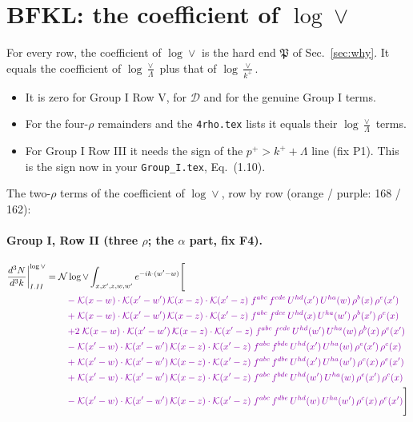 \documentclass[10pt]{article}
\numberwithin{equation}{section}
\newcommand{\NNv}{\mathcal N\log\vee}
\begin{document}
\section{BFKL: the coefficient of $\log\vee$}\label{sec:bfkl}
For every row, the coefficient of $\log\vee$ is the hard end $\mathfrak P$ of Sec.~\ref{sec:why}. It equals the coefficient of $\log\frac{\vee}{\Lambda}$ plus that of $\log\frac{\vee}{k^+}$.
\begin{itemize}
\item It is zero for Group I Row V, for $\mathcal D$ and for the genuine Group I terms.
\item For the four-$\rho$ remainders and the \texttt{4rho.tex} lists it equals their $\log\frac{\vee}{\Lambda}$ terms.
\item For Group I Row III it needs the sign of the $p^+>k^++\Lambda$ line (fix P1). This is the sign now in your \texttt{Group\_I.tex}, Eq.~(1.10).
\end{itemize}
The two-$\rho$ terms of the coefficient of $\log\vee$, row by row (orange / purple: 168 / 162):
\paragraph{Group I, Row II (three $\rho$; the $\alpha$ part, fix F4).}
\begin{align}
\frac{d^3N}{d^3k}\bigg|^{\log\vee}_{I.II}={}&\NNv\int_{x,x',z,w,w'}e^{-ik\cdot(w'-w)}\Bigg[\notag\\
&\quad{\color{CC}-\;\mathcal{K}(x-w)\cdot\mathcal{K}(x'-w')\,\mathcal{K}(x-z)\cdot\mathcal{K}(x'-z)\;f^{abc}\,f^{cde}\,U^{hd}(x')\,U^{ha}(w)\,\rho^{b}(x)\,\rho^{e}(x')}\notag\\
&\quad{\color{CC}+\;\mathcal{K}(x-w)\cdot\mathcal{K}(x'-w')\,\mathcal{K}(x-z)\cdot\mathcal{K}(x'-z)\;f^{abc}\,f^{dce}\,U^{hd}(x)\,U^{ha}(w')\,\rho^{b}(x')\,\rho^{e}(x)}\notag\\
&\quad{\color{CC}+2\;\mathcal{K}(x-w)\cdot\mathcal{K}(x'-w')\,\mathcal{K}(x-z)\cdot\mathcal{K}(x'-z)\;f^{abc}\,f^{cde}\,U^{hd}(w')\,U^{ha}(w)\,\rho^{b}(x)\,\rho^{e}(x')}\notag\\
&\quad{\color{CC}-\;\mathcal{K}(x'-w)\cdot\mathcal{K}(x'-w')\,\mathcal{K}(x-z)\cdot\mathcal{K}(x'-z)\;f^{abc}\,f^{bde}\,U^{hd}(x')\,U^{ha}(w)\,\rho^{e}(x')\,\rho^{c}(x)}\notag\\
&\quad{\color{CC}+\;\mathcal{K}(x'-w)\cdot\mathcal{K}(x'-w')\,\mathcal{K}(x-z)\cdot\mathcal{K}(x'-z)\;f^{abc}\,f^{dbe}\,U^{hd}(x')\,U^{ha}(w')\,\rho^{c}(x)\,\rho^{e}(x')}\notag\\
&\quad{\color{CC}+\;\mathcal{K}(x'-w)\cdot\mathcal{K}(x'-w')\,\mathcal{K}(x-z)\cdot\mathcal{K}(x'-z)\;f^{abc}\,f^{bde}\,U^{hd}(w')\,U^{ha}(w)\,\rho^{e}(x')\,\rho^{c}(x)}\notag\\
&\quad{\color{CC}-\;\mathcal{K}(x'-w)\cdot\mathcal{K}(x'-w')\,\mathcal{K}(x-z)\cdot\mathcal{K}(x'-z)\;f^{abc}\,f^{dbe}\,U^{hd}(w)\,U^{ha}(w')\,\rho^{c}(x)\,\rho^{e}(x')}\Bigg]\label{eq:P0}
\end{align}
\end{document}
